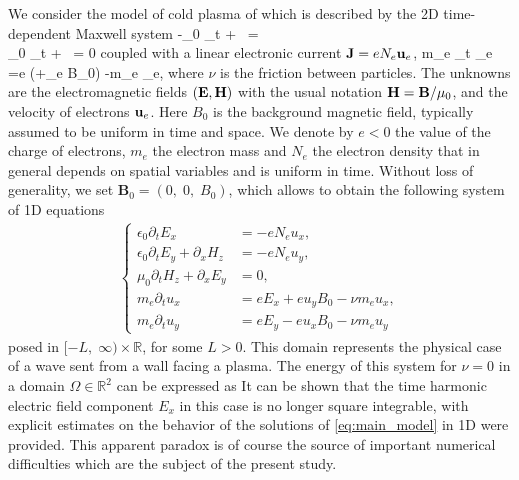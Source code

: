 We consider the model of cold plasma of \cite{Stix} which is described by the 2D time-dependent Maxwell system  
\bealn
-\varepsilon_0 \partial_t \E + \curl\, \Hbf = \J\\
\mu_0 \partial_t \Hbf + \curl\, \E = 0
\eealn
coupled with a linear electronic current  ${\bf J} = eN_e {\bf u}_e$, 
\ben
m_e \partial_t \ubf_e =e (\E +\ubf_e \wedge B_0) -m_e \nu \ubf_e, \label{eq:electronmove}
\een
where $\nu$ is  the friction  between particles.
The unknowns are the electromagnetic fields $({\bf E},{\bf H})$ with the usual notation ${\bf H} = {\bf B}/\mu_0$, 
and the velocity of electrons ${\bf u}_e$. Here $B_0$ is the background magnetic field, typically assumed to be uniform in time and space.  
We denote by $e<0$ the value of the charge of electrons, $m_e$ the electron mass and $N_e$ the electron density that in general 
depends on spatial variables and is uniform in time. 
Without loss of generality, we set $\mathbf{B}_0=\left(0,\; 0,\; B_0\right)$, which allows to obtain the following system of 1D equations 
\begin{align}
\label{eq:main_model}
\left\{\begin{array}{l}
\epsilon_0\partial_t E_{x}&=-eN_e u_x,\\
\epsilon_0\partial_t E_{y}+\partial_x H_z&=-eN_e u_y,\\
\mu_0\partial_t H_z+\partial_x E_y &=0,\\
m_e\partial_t u_x&=eE_x+eu_yB_0-\nu m_e u_x,\\
m_e\partial_t u_y&=eE_y-eu_xB_0-\nu m_e u_y
\end{array}
\right.\end{align}
posed in $[-L,\; \infty)\times \mathbb{R}$, for some $L>0$. This domain represents the physical case of a wave sent from a wall facing a plasma. 
The energy of this system for $\nu=0$ in a domain $\Omega\in\mathbb R^2$ can be expressed as \cite{stable_yee_plasma_current}
It can be shown    \cite{Despres_2014} 
that the time harmonic electric field component $E_x$ in this case is no longer square 
integrable, with 
explicit estimates on the behavior of the solutions of \eqref{eq:main_model} in 1D were provided. 
This apparent paradox  is of course the source of important numerical difficulties which are the subject of the present study.

